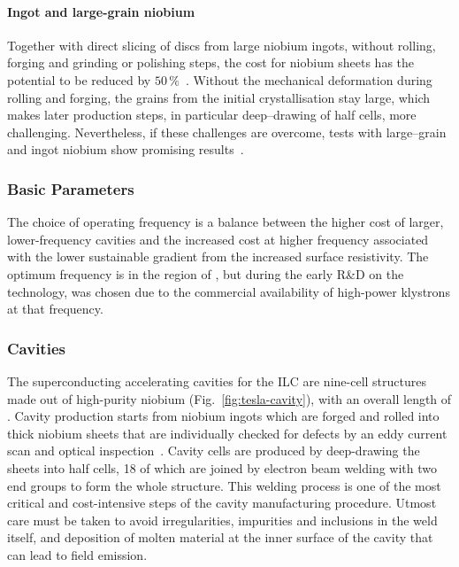 \paragraph{Ingot and large-grain niobium}

Together with direct slicing of discs from large niobium ingots, without rolling, forging and grinding or polishing steps, the cost for niobium sheets has the potential to be reduced by $50\,\%$~\cite{Evans:2017rvt,Kneisel:2014uqa}.
Without the mechanical deformation during rolling and forging, the grains from the initial crystallisation stay large, which makes later production steps, in particular deep--drawing of half cells, more challenging.
Nevertheless, if these challenges are overcome, tests with large--grain and ingot niobium show promising results~\cite{Reschke:2011a, Dhakal:2015xac}.


\subsubsection{Basic Parameters}

The choice of operating frequency is a balance between the higher cost of larger, lower-frequency cavities and the increased cost at higher frequency associated with the lower sustainable gradient from the increased surface resistivity. 
The optimum frequency is in the region of , but during the early R\&D on the technology,  was chosen due to the commercial availability of high-power klystrons at that frequency.

\subsubsection{Cavities}

The superconducting accelerating cavities for the ILC are nine-cell structures made out of high-purity niobium (Fig.~\ref{fig:tesla-cavity}), with an overall length of .
Cavity production starts from niobium ingots which are forged and rolled into  thick niobium sheets that are individually checked for defects by an eddy current scan and optical inspection~\cite{Adolphsen:2013jya}.
Cavity cells are produced by deep-drawing the sheets into half cells, \num{18} of which are joined by electron beam welding with two end groups to form the whole structure.
This welding process is one of the most critical and cost-intensive steps of the cavity manufacturing procedure. 
Utmost care must be taken to avoid irregularities, impurities and inclusions in the weld itself, and deposition of molten material at the inner surface of the cavity that can lead to field emission.

